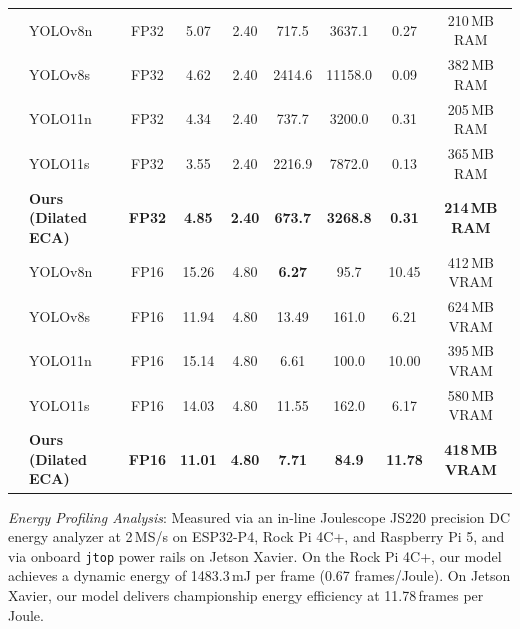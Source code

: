 \documentclass[journal,twoside,web]{ieeecolor}
\begin{document}
\begin{table}[t]
{\begin{tabular}{llccccccc}
\midrule
{}
 & YOLOv8n & FP32 & 5.07 & 2.40 & 717.5 & 3637.1 & 0.27 & 210\,MB RAM \\
 & YOLOv8s & FP32 & 4.62 & 2.40 & 2414.6 & 11158.0 & 0.09 & 382\,MB RAM \\
 & YOLO11n & FP32 & 4.34 & 2.40 & 737.7 & 3200.0 & 0.31 & 205\,MB RAM \\
 & YOLO11s & FP32 & 3.55 & 2.40 & 2216.9 & 7872.0 & 0.13 & 365\,MB RAM \\
 & \textbf{Ours (Dilated ECA)} & \textbf{FP32} & \textbf{4.85} & \textbf{2.40} & \textbf{673.7} & \textbf{3268.8} & \textbf{0.31} & \textbf{214\,MB RAM} \\
\midrule
{}
 & YOLOv8n & FP16 & 15.26 & 4.80 & \textbf{6.27} & 95.7 & 10.45 & 412\,MB VRAM \\
 & YOLOv8s & FP16 & 11.94 & 4.80 & 13.49 & 161.0 & 6.21 & 624\,MB VRAM \\
 & YOLO11n & FP16 & 15.14 & 4.80 & 6.61 & 100.0 & 10.00 & 395\,MB VRAM \\
 & YOLO11s & FP16 & 14.03 & 4.80 & 11.55 & 162.0 & 6.17 & 580\,MB VRAM \\
 & \textbf{Ours (Dilated ECA)} & \textbf{FP16} & \textbf{11.01} & \textbf{4.80} & \textbf{7.71} & \textbf{84.9} & \textbf{11.78} & \textbf{418\,MB VRAM} \\
\bottomrule
\end{tabular}%
}
\vspace{1ex}
{\raggedright \footnotesize \textit{Energy Profiling Analysis}: Measured via an in-line Joulescope JS220 precision DC energy analyzer at 2\,MS/s on ESP32-P4, Rock Pi 4C+, and Raspberry Pi 5, and via onboard \texttt{jtop} power rails on Jetson Xavier. On the Rock Pi 4C+, our model achieves a dynamic energy of 1483.3\,mJ per frame (0.67 frames/Joule). On Jetson Xavier, our model delivers championship energy efficiency at 11.78\,frames per Joule.\par}
\end{table}
\end{document}
